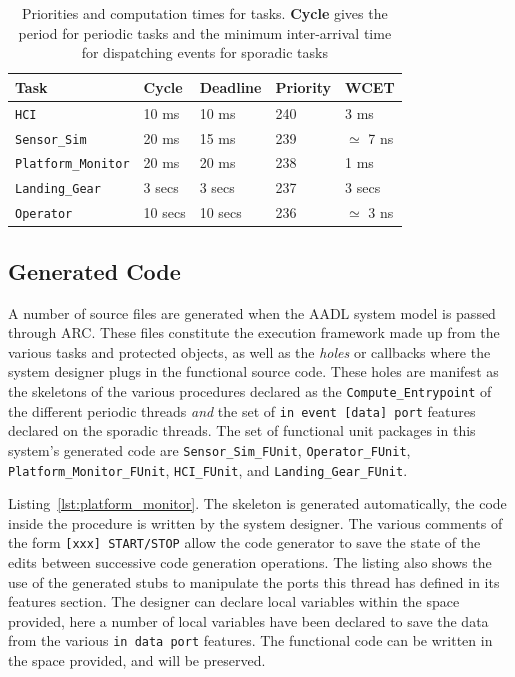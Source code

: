 \begin{table}
\centering
\begin{tabular}{|l|l|l|l|l|}
\hline
\textbf{Task} & \textbf{Cycle} & \textbf{Deadline} &
\textbf{Priority} & \textbf{WCET}\\
\hline
\texttt{HCI} & 10 ms & 10 ms & 240 & 3 ms\\
\texttt{Sensor\_Sim} & 20 ms & 15 ms & 239 & $\simeq$ 7 ns\\
\texttt{Platform\_Monitor} & 20 ms & 20 ms & 238 & 1 ms\\
\texttt{Landing\_Gear} & 3 secs & 3 secs & 237 & 3 secs\\
\texttt{Operator} & 10 secs & 10 secs & 236 & $\simeq$ 3 ns\\
\hline
\end{tabular}
\caption{Priorities and computation times for tasks. \textbf{Cycle}
  gives the period for periodic tasks and the minimum inter-arrival
  time for dispatching events for sporadic tasks}
\label{tab:task_set}
\end{table}

\subsection{Generated Code}
\label{sec:case_study_codegen}
A number of source files are generated when the AADL system model is
passed through ARC. These files constitute the execution framework
made up from the various tasks and protected objects, as well as the
\emph{holes} or callbacks where the system designer plugs in the
functional source code. These holes are manifest as the skeletons of
the various procedures declared as the \texttt{Compute\_Entrypoint} of
the different periodic threads \emph{and} the set of \texttt{in event
  [data] port} features declared on the sporadic threads. The set of
functional unit packages in this system's generated code are
\texttt{Sensor\_Sim\_FUnit}, \texttt{Operator\_FUnit},
\texttt{Platform\_Monitor\_FUnit}, \texttt{HCI\_FUnit}, and
\texttt{Landing\_Gear\_FUnit}. 

Listing~\ref{lst:platform_monitor}. The skeleton is generated
automatically, the code inside the procedure is written by the system
designer. The various comments of the form \texttt{[xxx] START/STOP}
allow the code generator to save the state of the edits between
successive code generation operations. The listing also shows the use
of the generated stubs to manipulate the ports this thread has defined
in its features section. The designer can declare local variables
within the space provided, here a number of local variables have been
declared to save the data from the various \texttt{in data port}
features. The functional code can be written in the space provided,
and will be preserved.

